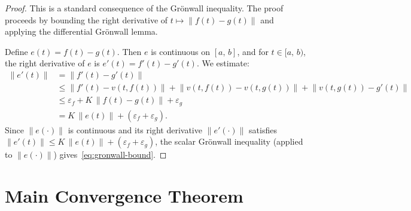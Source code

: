 \documentclass[11pt,a4paper]{article}
\theoremstyle{definition}
\newcommand{\norm}[1]{\lVert #1 \rVert}
\newcommand{\Icc}[2]{[#1,\, #2]}
\newcommand{\Ico}[2]{[#1,\, #2)}
\begin{document}
\begin{proof}
This is a standard consequence of the Gr\"onwall inequality.
The proof proceeds by bounding the right derivative of
$t \mapsto \norm{f(t) - g(t)}$ and applying the differential
Gr\"onwall lemma.

Define $e(t) = f(t) - g(t)$. Then $e$ is continuous on $\Icc{a}{b}$,
and for $t \in \Ico{a}{b}$, the right derivative of $e$ is
$e'(t) = f'(t) - g'(t)$. We estimate:
\begin{align*}
  \norm{e'(t)}
  &= \norm{f'(t) - g'(t)} \\
  &\le \norm{f'(t) - v(t, f(t))} + \norm{v(t, f(t)) - v(t, g(t))}
     + \norm{v(t, g(t)) - g'(t)} \\
  &\le \varepsilon_f + K\,\norm{f(t) - g(t)} + \varepsilon_g \\
  &= K\,\norm{e(t)} + (\varepsilon_f + \varepsilon_g).
\end{align*}
Since $\norm{e(\cdot)}$ is continuous and its right derivative
$\norm{e'(\cdot)}$ satisfies
$\norm{e'(t)} \le K\,\norm{e(t)} + (\varepsilon_f + \varepsilon_g)$,
the scalar Gr\"onwall inequality (applied to $\norm{e(\cdot)}$)
gives~\eqref{eq:gronwall-bound}.
\end{proof}


\section{Main Convergence Theorem}\label{sec:convergence}
\end{document}
